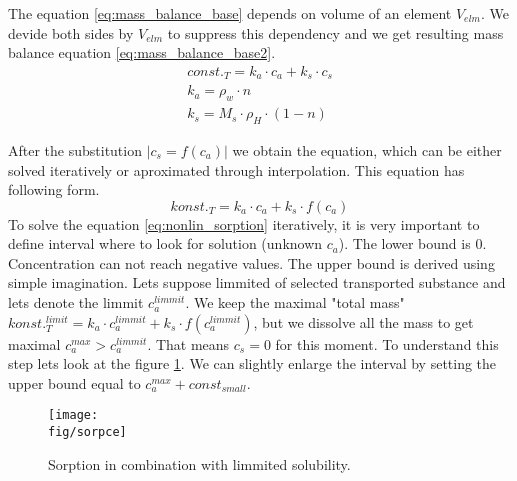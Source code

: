 The equation \ref{eq:mass_balance_base} depends on volume of an element $V_{elm}$. We devide both sides by $V_{elm}$ to suppress this dependency and we get resulting mass balance equation \ref{eq:mass_balance_base2}.
\begin{equation}
 \begin{array}{l}
  const._T = k_a\cdot c_a + k_s\cdot c_s\\
  k_a = \rho_w\cdot n\\
  k_s = M_s \cdot\rho_H\cdot(1-n)
 \end{array}
 \label{eq:mass_balance_base2}
\end{equation}

After the substitution $|c_s = f(c_a)|$ we obtain the equation, which can be either solved iteratively or aproximated through interpolation. This equation has following form.
\begin{equation}
 konst._T = k_a\cdot c_a + k_s\cdot f(c_a)
 \label{eq:nonlin_sorption}
\end{equation}
To solve the equation \ref{eq:nonlin_sorption} iteratively, it is very important to define interval where to look for solution (unknown $c_a$). The lower bound is $0$. Concentration can not reach negative values. The upper bound is derived using simple imagination. Lets suppose limmited  of selected transported substance and lets denote the limmit $c_a^{limmit}$. We keep the maximal "total mass" $konst._T^{limit}= k_a\cdot c_a^{limmit} + k_s\cdot f(c_a^{limmit})$, but we dissolve all the mass to get maximal $c_a^{max} > c_a^{limmit}$. That means $c_s = 0$ for this moment. To understand this step lets look at the figure \ref{fig:sorpce}. We can slightly enlarge the interval by setting the upper bound equal to $c_a^{max} + const_{small}$.

\begin{figure}[ht!]
 \centering
 \texttt{[image: \\fig/sorpce]}
 \caption{Sorption in combination with limmited solubility.}
 \label{fig:sorpce}
\end{figure}



